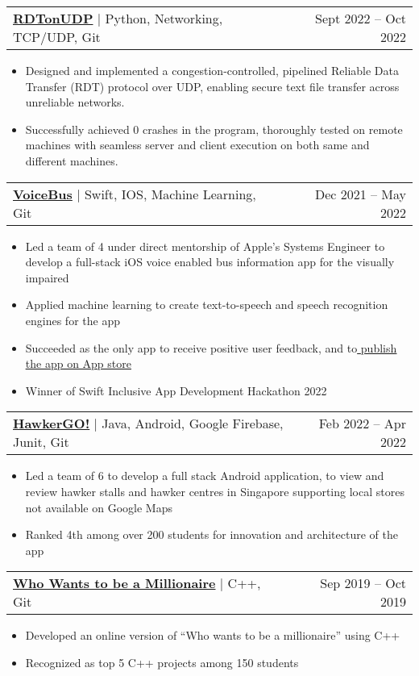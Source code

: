 \documentclass[letterpaper,11pt]{article}
\makeatletter
\newcommand{\resumeItem}[1]{
  \item\small{
    {#1 \vspace{-2.5pt}}
  }
}
\newcommand{\resumeProjectHeading}[2]{
    \item
    \begin{tabular*}{0.97\textwidth}{l@{\extracolsep{\fill}}r}
      \small#1 & \footnotesize#2 \\
    \end{tabular*}\vspace{-7pt}
}
\newcommand{\resumeItemListStart}{\begin{itemize}}
\newcommand{\resumeItemListEnd}{\end{itemize}\vspace{-5pt}}
\makeatother
\begin{document}
         \resumeProjectHeading
            {\textbf{{\href{https://github.com/Usgupta/RDTonUDP}{\faExternalLink* RDTonUDP}}} $|$ {Python, Networking, TCP/UDP, Git}}{Sept 2022 -- Oct 2022}
          \resumeItemListStart
            \resumeItem{Designed and implemented a congestion-controlled, pipelined Reliable Data Transfer (RDT) protocol over UDP, enabling secure text file transfer across unreliable networks.}
            \resumeItem{Successfully achieved 0 crashes in the program, thoroughly tested on remote machines with seamless server and client execution on both same and different machines.}
        
           
          \resumeItemListEnd

    
      \resumeProjectHeading
          {\textbf{{\href{https://github.com/Usgupta/voicebus}{\faExternalLink* VoiceBus}}} $|$ {Swift, IOS, Machine Learning, Git}}{\footnotesize	{Dec 2021 -- May 2022}}
          \resumeItemListStart
            \resumeItem{Led a team of 4 under direct mentorship of Apple's Systems Engineer to develop a full-stack iOS voice enabled bus information app for the visually impaired}
            \resumeItem{Applied machine learning to create text-to-speech and speech recognition engines for the app}
            \resumeItem{Succeeded as the only app to receive positive user feedback, and to\href{https://apps.apple.com/app/voicebus/id1624028704}{ \underline{publish the app on App store}}}
            \resumeItem{Winner of Swift Inclusive App Development Hackathon 2022}
           
          \resumeItemListEnd

          \resumeProjectHeading
          {\textbf{{\href{https://github.com/Usgupta/HawkerGO}{\faExternalLink* HawkerGO!}}} $|$ {Java, Android, Google Firebase, Junit, Git}}{\footnotesize	{Feb 2022 -- Apr 2022}}
          
          \resumeItemListStart
            \resumeItem{Led a team of 6 to develop a full stack Android application, to view and review hawker stalls and hawker centres in Singapore supporting local stores not available on Google Maps}
            \resumeItem{Ranked 4th among over 200 students for innovation and architecture of the app}
          \resumeItemListEnd
          
          \resumeProjectHeading
              {\textbf{{\href{https://github.com/Usgupta/KBC}{\faExternalLink* Who Wants to be a Millionaire}}} $|$ {C++, Git}}{\footnotesize	{Sep 2019 -- Oct 2019}}
          \resumeItemListStart
            \resumeItem{Developed an online version of “Who wants to be a millionaire” using C++}
            \resumeItem{Recognized as top 5 C++ projects among 150 students}
          \resumeItemListEnd
       
\end{document}
